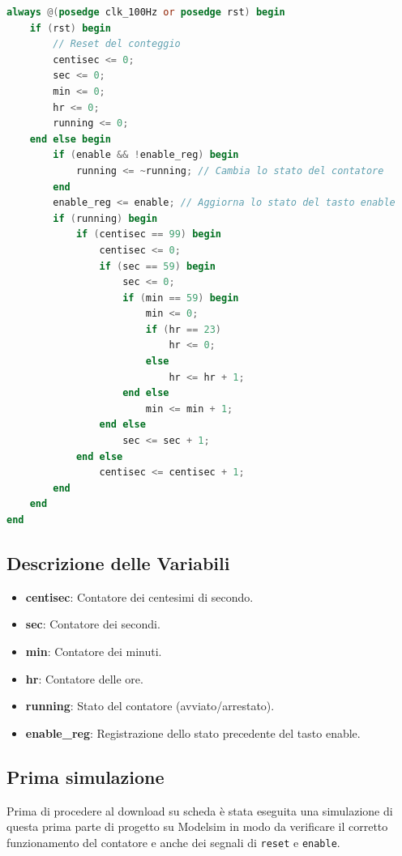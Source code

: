 \documentclass{article}
\begin{document}
\begin{lstlisting}[language=Verilog, caption={Estratto del Modulo del Contatore}]
always @(posedge clk_100Hz or posedge rst) begin
    if (rst) begin
        // Reset del conteggio
        centisec <= 0;
        sec <= 0;
        min <= 0;
        hr <= 0;
        running <= 0;
    end else begin
        if (enable && !enable_reg) begin
            running <= ~running; // Cambia lo stato del contatore
        end
        enable_reg <= enable; // Aggiorna lo stato del tasto enable
        if (running) begin
            if (centisec == 99) begin
                centisec <= 0;
                if (sec == 59) begin
                    sec <= 0;
                    if (min == 59) begin
                        min <= 0;
                        if (hr == 23)
                            hr <= 0;
                        else
                            hr <= hr + 1;
                    end else
                        min <= min + 1;
                end else
                    sec <= sec + 1;
            end else
                centisec <= centisec + 1;
        end
    end
end
\end{lstlisting}

\subsection{Descrizione delle Variabili}
\begin{itemize}
    \item \textbf{centisec}: Contatore dei centesimi di secondo.
    \item \textbf{sec}: Contatore dei secondi.
    \item \textbf{min}: Contatore dei minuti.
    \item \textbf{hr}: Contatore delle ore.
    \item \textbf{running}: Stato del contatore (avviato/arrestato).
    \item \textbf{enable\_reg}: Registrazione dello stato precedente del tasto enable.
\end{itemize}

\subsection{Prima simulazione}

Prima di procedere al download su scheda è stata eseguita una simulazione di questa prima parte di progetto su Modelsim in modo da verificare il corretto funzionamento del contatore e anche dei segnali di \texttt{reset} e \texttt{enable}.
\end{document}
